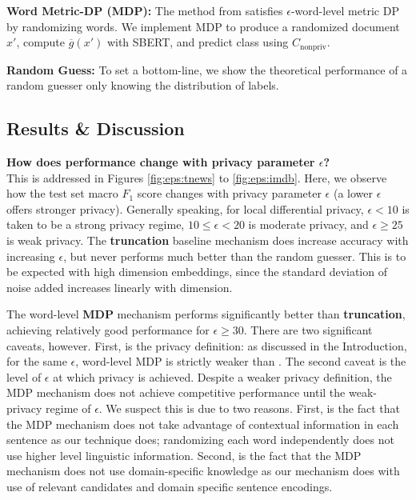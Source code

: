 \textbf{Word Metric-DP (MDP):} The method from \citealt{metricdp} satisfies $\epsilon$-word-level metric DP by randomizing words. We implement MDP to produce a randomized document $x'$, compute $\overline{g}(x')$ with SBERT, and predict class using $C_{\text{nonpriv}}$. 

\textbf{Random Guess:} To set a bottom-line, we show the theoretical performance of a random guesser only knowing the distribution of labels. 

\subsection{Results \& Discussion} 
\textbf{How does performance change with privacy parameter $\epsilon$?}\\ 
This is addressed in Figures \ref{fig:eps:tnews} to \ref{fig:eps:imdb}. Here, we observe how the test set macro $F_1$ score changes with privacy parameter $\epsilon$ (a lower $\epsilon$ offers stronger privacy). Generally speaking, for local differential privacy, $\epsilon < 10$ is taken to be a strong privacy regime, $10 \leq \epsilon < 20$ is moderate privacy, and $\epsilon \geq 25$ is weak privacy. The \textbf{truncation} baseline mechanism does increase accuracy with increasing $\epsilon$, but never performs much better than the random guesser. This is to be expected with high dimension embeddings, since the standard deviation of noise added increases linearly with dimension. 

The word-level \textbf{MDP} mechanism performs significantly better than \textbf{truncation}, achieving relatively good performance for $\epsilon \geq 30$. There are two significant caveats, however. First, is the privacy definition: as discussed in the Introduction, for the same $\epsilon$, word-level MDP is strictly weaker than \SDP. 
The second caveat is the level of $\epsilon$ at which privacy is achieved. Despite a weaker privacy definition, the MDP mechanism does not achieve competitive performance until the weak-privacy regime of $\epsilon$. We suspect this is due to two reasons. First, is the fact that the MDP mechanism does not take advantage of contextual information in each sentence as our technique does; randomizing each word independently does not use higher level linguistic information. Second, is the fact that the MDP mechanism does not use domain-specific knowledge as our mechanism does with use of relevant candidates and domain specific sentence encodings. 

